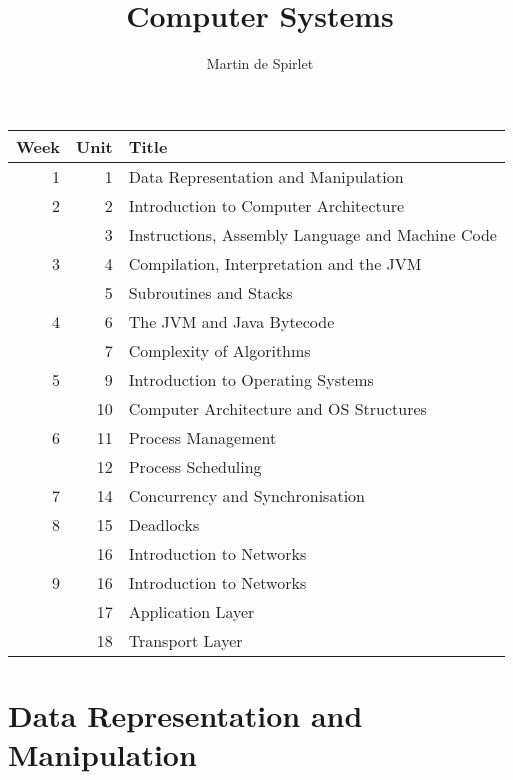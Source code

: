 \documentclass[
  11pt,
  a4paper,
]{article}
\title{Computer Systems}
\author{Martin de Spirlet}
\date{}
\begin{document}

\maketitle

\vspace*{\fill}

\begin{table}[htp]
  \centering
  \begin{tabular}{rrl}
    \toprule
    Week & Unit & Title \\
    \midrule
     1 &  1 & Data Representation and Manipulation \\[1ex]
     2 &  2 & Introduction to Computer Architecture \\
       &  3 & Instructions, Assembly Language and Machine Code \\[1ex]
     3 &  4 & Compilation, Interpretation and the JVM \\
       &  5 & Subroutines and Stacks \\[1ex]
     4 &  6 & The JVM and Java Bytecode \\
       &  7 & Complexity of Algorithms \\[1ex]
     5 &  9 & Introduction to Operating Systems \\
       & 10 & Computer Architecture and OS Structures \\[1ex]
     6 & 11 & Process Management \\
       & 12 & Process Scheduling \\[1ex]
     7 & 14 & Concurrency and Synchronisation \\[1ex]
     8 & 15 & Deadlocks \\
       & 16 & Introduction to Networks \\[1ex]
     9 & 16 & Introduction to Networks \\
       & 17 & Application Layer \\
       & 18 & Transport Layer \\
    \bottomrule
  \end{tabular}
\end{table}

\vspace*{\fill}
\addvspace{1in}

\clearpage


\section{Data Representation and Manipulation}

\end{document}
